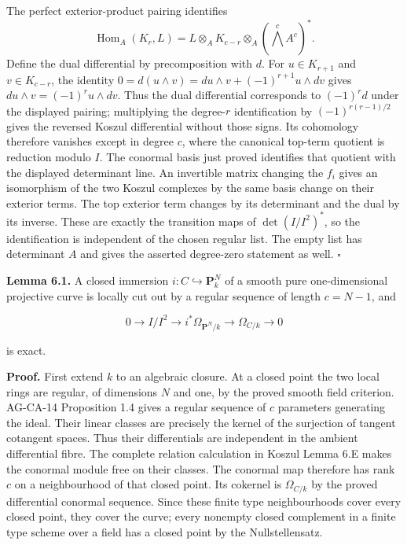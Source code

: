 \documentclass[11pt,a4paper,openany]{report}
\newcounter{none}
\begin{document}
The perfect exterior-product pairing identifies \[
\operatorname{Hom}_A(K_r,L)
 =L\otimes_A K_{c-r}\otimes_A(\bigwedge^c A^c)^*.
\] Define the dual differential by precomposition with \(d\). For \(u\in K_{r+1}\) and \(v\in K_{c-r}\), the identity \(0=d(u\wedge v)=du\wedge v+(-1)^{r+1}u\wedge dv\) gives \(du\wedge v=(-1)^r u\wedge dv\). Thus the dual differential corresponds to \((-1)^r d\) under the displayed pairing; multiplying the degree-\(r\) identification by \((-1)^{r(r-1)/2}\) gives the reversed Koszul differential without those signs. Its cohomology therefore vanishes except in degree \(c\), where the canonical top-term quotient is reduction modulo \(I\). The conormal basis just proved identifies that quotient with the displayed determinant line. An invertible matrix changing the \(f_i\) gives an isomorphism of the two Koszul complexes by the same basis change on their exterior terms. The top exterior term changes by its determinant and the dual by its inverse. These are exactly the transition maps of \(\det(I/I^2)^*\), so the identification is independent of the chosen regular list. The empty list has determinant \(A\) and gives the asserted degree-zero statement as well. \(\square\)

\textbf{Lemma 6.1.} A closed immersion \(i:C\hookrightarrow\mathbf P^N_k\) of a smooth pure one-dimensional projective curve is locally cut out by a regular sequence of length \(c=N-1\), and

\[
0\to I/I^2\to i^*\Omega_{\mathbf P^N/k}\to\Omega_{C/k}\to0
\]

is exact.

\textbf{Proof.} First extend \(k\) to an algebraic closure. At a closed point the two local rings are regular, of dimensions \(N\) and one, by the proved smooth field criterion. AG-CA-14 Proposition 1.4 gives a regular sequence of \(c\) parameters generating the ideal. Their linear classes are precisely the kernel of the surjection of tangent cotangent spaces. Thus their differentials are independent in the ambient differential fibre. The complete relation calculation in Koszul Lemma 6.E makes the conormal module free on their classes. The conormal map therefore has rank \(c\) on a neighbourhood of that closed point. Its cokernel is \(\Omega_{C/k}\) by the proved differential conormal sequence. Since these finite type neighbourhoods cover every closed point, they cover the curve; every nonempty closed complement in a finite type scheme over a field has a closed point by the Nullstellensatz.
\end{document}
